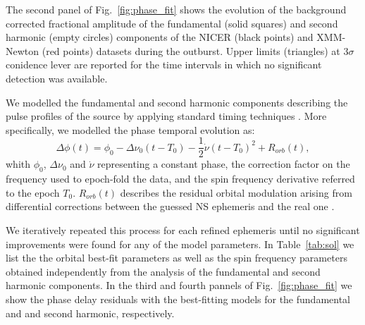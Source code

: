 \documentclass[fleqn,usenatbib]{mnras}
\newcommand{\nicer}{NICER}
\newcommand{\xmm}{XMM-Newton}
\begin{document}
The second panel of Fig.~\ref{fig:phase_fit} shows the evolution of the background corrected fractional amplitude of the fundamental (solid squares) and second harmonic (empty circles) components of the \nicer{} (black points) and \xmm{} (red points) datasets during the outburst. Upper limits (triangles) at $3\sigma$ conidence lever are reported for the time intervals in which no significant detection was available.  


We modelled the fundamental and second harmonic components describing the pulse profiles of the source by applying standard timing techniques \citep[see e.g.][for more details]{Burderi:2007tl, Sanna:2018wh}. More specifically, we modelled the phase temporal evolution as:
\begin{equation}
\Delta \phi(t)= \phi_0 - \Delta \nu_0(t-T_0)- \frac{1}{2} \dot{\nu}(t-T_0)^2+R_{orb}(t),
\end{equation}
whith $\phi_0$, $\Delta \nu_0$ and $\dot{\nu}$ representing a constant phase, the correction factor on the frequency used to epoch-fold the data, and the spin frequency derivative referred to the epoch $T_0$. $R_{orb}(t)$ describes the residual orbital modulation arising from differential corrections between the guessed NS ephemeris and the real one \citep[see e.g.][]{Deeter:1981te}.

We iteratively repeated this process for each refined ephemeris until no significant improvements were found for any of the model parameters. In Table~\ref{tab:sol} we list the   the orbital best-fit parameters as well as the spin frequency parameters obtained independently from the analysis of the fundamental and second harmonic components. In the third and fourth pannels of Fig.~\ref{fig:phase_fit} we show the phase delay residuals with the best-fitting models for the fundamental and and second harmonic, respectively. 
\end{document}

